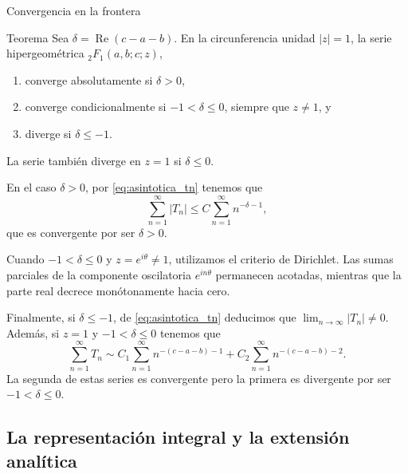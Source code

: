 \documentclass[xcolor=dvipsnames,10pt]{beamer}
\newcommand{\abs}[1]{\left\vert#1\right\vert}
\newcommand{\rioja}[1]{\textcolor[RGB]{115,0,60}{#1}}
\renewcommand{\Re}{\operatorname{Re}}
\renewcommand{\lim}{\operatorname{lim}}
\begin{document}
\begin{frame}{Convergencia en la frontera}
    \begin{block}{Teorema}
        Sea $\delta = \Re(c-a-b)$. En la circunferencia unidad $|z|=1$, la serie hipergeométrica ${}_{2}F_{1}(a,b;c;z)$,
        \begin{enumerate}
            \item converge absolutamente si $\delta > 0$,
            \item converge condicionalmente si $-1 < \delta \le 0$, siempre que $z \neq 1$, y
            \item diverge si $\delta \le -1$.
        \end{enumerate}
        La serie también diverge en $z=1$ si $\delta \leq 0$.
    \end{block}
    
    \vspace{0.1cm}
    \begin{overprint}
        En el caso $\delta > 0$, por \eqref{eq:asintotica_tn} tenemos que 
        \[
        \sum_{n=1}^\infty |T_n| \le C\sum_{n=1}^\infty n^{-\delta -1},
        \]
        que es convergente por ser $\delta > 0$.

        Cuando $-1 < \delta \le 0$ y $z = e^{i\theta} \neq 1$, utilizamos el \rioja{criterio de Dirichlet}. Las sumas parciales de la componente oscilatoria $e^{in\theta}$ permanecen acotadas, mientras que la parte real decrece monótonamente hacia cero.

        Finalmente, si $\delta \le -1$, de \eqref{eq:asintotica_tn} deducimos que $\lim_{n\to\infty} \abs{T_n} \neq 0$. 
        Además, si $z=1$ y $-1 < \delta \le 0$ tenemos que 
        \[
        \sum_{n=1}^\infty T_n \sim C_1 \sum_{n=1}^\infty n^{-(c-a-b)-1} + C_2 \sum_{n=1}^\infty n^{-(c-a-b)-2}.
        \]
        La segunda de estas series es convergente pero la primera es divergente por ser $-1 < \delta \le 0$.
    \end{overprint}
\end{frame}

\subsection{La representación integral y la extensión analítica}
\end{document}
